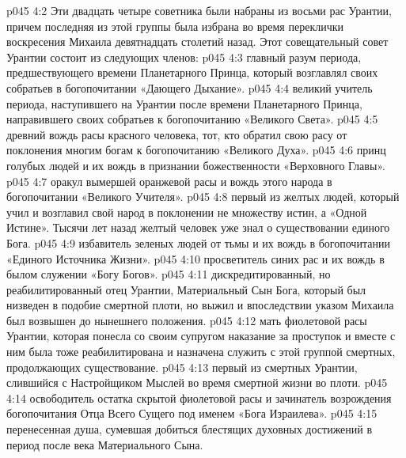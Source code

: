 \vs p045 4:2 Эти двадцать четыре советника были набраны из восьми рас Урантии, причем последняя из этой группы была избрана во время переклички воскресения Михаила девятнадцать столетий назад. Этот совещательный совет Урантии состоит из следующих членов:
\vs p045 4:3 \bibnobreakspace {} главный разум периода, предшествующего времени Планетарного Принца, который возглавлял своих собратьев в богопочитании «Дающего Дыхание».
\vs p045 4:4 \bibnobreakspace {} великий учитель периода, наступившего на Урантии после времени Планетарного Принца, направившего своих собратьев к богопочитанию «Великого Света».
\vs p045 4:5 \bibnobreakspace {} древний вождь расы красного человека, тот, кто обратил свою расу от поклонения многим богам к богопочитанию «Великого Духа».
\vs p045 4:6 \bibnobreakspace {} принц голубых людей и их вождь в признании божественности «Верховного Главы».
\vs p045 4:7 \bibnobreakspace {} оракул вымершей оранжевой расы и вождь этого народа в богопочитании «Великого Учителя».
\vs p045 4:8 \bibnobreakspace {} первый из желтых людей, который учил и возглавил свой народ в поклонении не множеству истин, а «Одной Истине». Тысячи лет назад желтый человек уже знал о существовании единого Бога.
\vs p045 4:9 \bibnobreakspace {} избавитель зеленых людей от тьмы и их вождь в богопочитании «Единого Источника Жизни».
\vs p045 4:10 \bibnobreakspace {} просветитель синих рас и их вождь в былом служении «Богу Богов».
\vs p045 4:11 \bibnobreakspace {} дискредитированный, но реабилитированный отец Урантии, Материальный Сын Бога, который был низведен в подобие смертной плоти, но выжил и впоследствии указом Михаила был возвышен до нынешнего положения.
\vs p045 4:12 \bibnobreakspace {} мать фиолетовой расы Урантии, которая понесла со своим супругом наказание за проступок и вместе с ним была тоже реабилитирована и назначена служить с этой группой смертных, продолжающих существование.
\vs p045 4:13 \bibnobreakspace {} первый из смертных Урантии, слившийся с Настройщиком Мыслей во время смертной жизни во плоти.
\vs p045 4:14 \bibnobreakspace {} освободитель остатка скрытой фиолетовой расы и зачинатель возрождения богопочитания Отца Всего Сущего под именем «Бога Израилева».
\vs p045 4:15 \bibnobreakspace {} перенесенная душа, сумевшая добиться блестящих духовных достижений в период после века Материального Сына.
